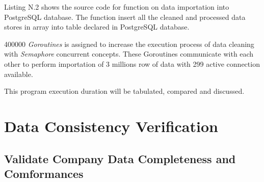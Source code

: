 Listing N.2 shows the source code for function on data importation into PostgreSQL database. The function insert all the cleaned and processed data stores in array into table declared in PostgreSQL database. 

400000 \textit{Goroutines} is assigned to increase the execution process of data cleaning with \textit{Semaphore} concurrent concepts. These Goroutines communicate with each other to perform importation of 3 millions row of data with 299 active connection available. 

This program execution duration will be tabulated, compared and discussed. 

\section{Data Consistency Verification}

\subsection{Validate Company Data Completeness and Comformances}

